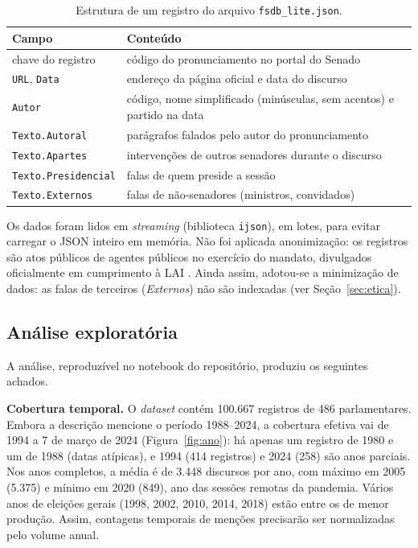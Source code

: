 \documentclass[12pt]{article}
\begin{document}
\begin{table}[ht]
\centering
\caption{Estrutura de um registro do arquivo \texttt{fsdb\_lite.json}.}
\label{tab:estrutura}
\footnotesize
\begin{tabularx}{\textwidth}{@{}p{4.0cm}Y@{}}
\toprule
\textbf{Campo} & \textbf{Conteúdo} \\
\midrule
chave do registro & código do pronunciamento no portal do Senado \\
\texttt{URL}, \texttt{Data} & endereço da página oficial e data do discurso \\
\texttt{Autor} & código, nome simplificado (minúsculas, sem acentos) e partido na data \\
\texttt{Texto.Autoral} & parágrafos falados pelo autor do pronunciamento \\
\texttt{Texto.Apartes} & intervenções de outros senadores durante o discurso \\
\texttt{Texto.Presidencial} & falas de quem preside a sessão \\
\texttt{Texto.Externos} & falas de não-senadores (ministros, convidados) \\
\bottomrule
\end{tabularx}
\end{table}

Os dados foram lidos em \textit{streaming} (biblioteca \texttt{ijson}), em lotes, para evitar
carregar o JSON inteiro em memória. Não foi aplicada anonimização: os registros são atos públicos
de agentes públicos no exercício do mandato, divulgados oficialmente em cumprimento à LAI
\cite{brasil2011}. Ainda assim, adotou-se a minimização de dados: as falas de terceiros
(\textit{Externos}) não são indexadas (ver Seção~\ref{sec:etica}).

\subsection{Análise exploratória}\label{sec:eda}

A análise, reproduzível no notebook do repositório, produziu os seguintes achados.

\textbf{Cobertura temporal.} O \textit{dataset} contém 100.667 registros de 486 parlamentares.
Embora a descrição mencione o período 1988--2024, a cobertura efetiva vai de 1994 a 7 de março
de 2024 (Figura~\ref{fig:ano}): há apenas um registro de 1980 e um de 1988 (datas atípicas), e
1994 (414 registros) e 2024 (258) são anos parciais. Nos anos completos, a média é de 3.448
discursos por ano, com máximo em 2005 (5.375) e mínimo em 2020 (849), ano das sessões remotas da
pandemia. Vários anos de eleições gerais (1998, 2002, 2010, 2014, 2018) estão entre os de menor
produção. Assim, contagens temporais de menções precisarão ser normalizadas pelo volume anual.
\end{document}
